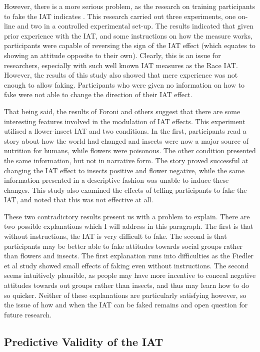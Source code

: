 However, there is a more serious problem, as the research on training participants to fake the IAT indicates \cite{Fiedler2005}. This research carried out three experiments, one on-line and two in a controlled experimental set-up. The results indicated that given prior experience with the IAT, and some instructions on how the measure works, participants were capable of reversing the sign of the IAT effect (which equates to showing an attitude opposite to their own). Clearly, this is an issue for researchers, especially with such well known IAT measures as the Race IAT. However, the results of this study also showed that mere experience was not enough to allow faking. Participants who were given no information on how to fake were not able to change the direction of their IAT effect. 

That being said, the results of Foroni and others \cite{Foroni2005}  suggest that there are some interesting features involved in the modulation of IAT effects. This experiment utilised a flower-insect IAT \cite{Greenwald1998} and two conditions. In the first, participants read a story about how the world had changed and insects were now a major source of nutrition for humans, while flowers were poisonous. The other condition presented the same information, but not in narrative form. The story proved successful at changing the IAT effect to insects positive and flower negative, while the same information presented in a descriptive fashion was unable to induce these changes. This study also examined the effects of telling participants to fake the IAT, and noted that this was not effective at all. 

These two contradictory results present us with a problem to explain. There are two possible explanations which I will address in this paragraph. The first is that without instructions, the IAT is very difficult to fake. The second is that participants may be better able to fake attitudes towards social groups rather than flowers and insects. The first explanation runs into difficulties as the Fiedler et al  study showed small effects of faking even without instructions. The second seems intuitively plausible, as people may have more incentive to conceal negative attitudes towards out groups rather than insects, and thus may learn how to do so quicker. Neither of these explanations are particularly satisfying however, so the issue of how and when the IAT can be faked remains and open question for future research. 

 
\subsection{Predictive Validity of the IAT}

